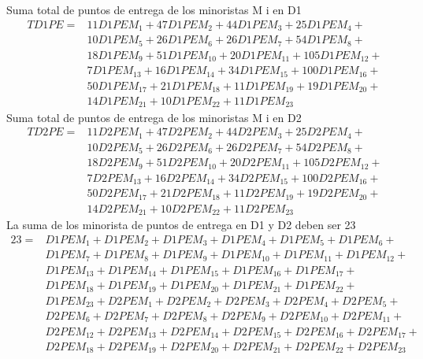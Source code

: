 Suma total de puntos de entrega de los minoristas M i en  D1 
\begin{equation*}
\begin{split}
  TD1PE = & 11 D1PEM_1 + 47 D1PEM_2 + 44 D1PEM_3 + 25 D1PEM_4 + \\ 
  		  & 10 D1PEM_5 + 26 D1PEM_6 + 26 D1PEM_7 + 54 D1PEM_8 + \\
  		  & 18 D1PEM_9 + 51 D1PEM_{10} + 20 D1PEM_{11} + 105 D1PEM_{12} + \\ 
  		  &  7 D1PEM_{13} + 16 D1PEM_{14} + 34 D1PEM_{15} + 100 D1PEM_{16} + \\ 
  		  & 50 D1PEM_{17} + 21 D1PEM_{18} + 11 D1PEM_{19} + 19 D1PEM_{20} + \\
		  & 14 D1PEM_{21} + 10 D1PEM_{22} + 11 D1PEM_{23} 
\end{split}
\end{equation*}
Suma total de puntos de entrega de los minoristas M i en  D2 
\begin{equation*}
\begin{split}
  TD2PE = & 11 D2PEM_1 + 47 D2PEM_2 + 44 D2PEM_3 + 25 D2PEM_4 + \\ 
  		  & 10 D2PEM_5 + 26 D2PEM_6 + 26 D2PEM_7 + 54 D2PEM_8 + \\
  		  & 18 D2PEM_9 + 51 D2PEM_{10} + 20 D2PEM_{11} + 105 D2PEM_{12} + \\ 
  		  &  7 D2PEM_{13} + 16 D2PEM_{14} + 34 D2PEM_{15} + 100 D2PEM_{16} + \\ 
  		  & 50 D2PEM_{17} + 21 D2PEM_{18} + 11 D2PEM_{19} + 19 D2PEM_{20} + \\
		  & 14 D2PEM_{21} + 10 D2PEM_{22} + 11 D2PEM_{23} 
\end{split}
\end{equation*}
La suma de los minorista de puntos de entrega en D1 y D2 deben ser 23
\begin{equation*}
\begin{split}
23 = & D1PEM_1 + D1PEM_2 + D1PEM_3 + D1PEM_4 + D1PEM_5 + D1PEM_6 + \\
     & D1PEM_7 + D1PEM_8 + D1PEM_9 + D1PEM_{10} + D1PEM_{11} + D1PEM_{12} +\\
     & D1PEM_{13} + D1PEM_{14} + D1PEM_{15} + D1PEM_{16} + D1PEM_{17} + \\
     & D1PEM_{18} + D1PEM_{19} + D1PEM_{20} + D1PEM_{21} + D1PEM_{22} + \\
	 & D1PEM_{23} + D2PEM_1 + D2PEM_2 + D2PEM_3 + D2PEM_4 + D2PEM_5 + \\
	 & D2PEM_6 + D2PEM_7 + D2PEM_8 + D2PEM_9 + D2PEM_{10} + D2PEM_{11} + \\
	 & D2PEM_{12} + D2PEM_{13} + D2PEM_{14} + D2PEM_{15} + D2PEM_{16} + D2PEM_{17} +\\
	 & D2PEM_{18} + D2PEM_{19} + D2PEM_{20} + D2PEM_{21} + D2PEM_{22} + D2PEM_{23}
\end{split}
\end{equation*}
